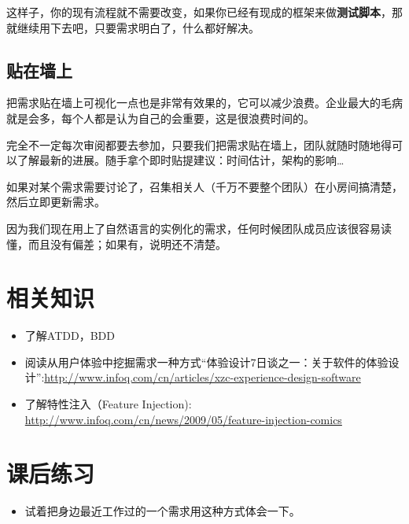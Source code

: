 这样子，你的现有流程就不需要改变，如果你已经有现成的框架来做\textbf{测试脚本}，那就继续用下去吧，只要需求明白了，什么都好解决。

\subsection{贴在墙上}
\label{贴在墙上}

把需求贴在墙上可视化一点也是非常有效果的，它可以减少浪费。企业最大的毛病就是会多，每个人都是认为自己的会重要，这是很浪费时间的。

完全不一定每次审阅都要去参加，只要我们把需求贴在墙上，团队就随时随地得可以了解最新的进展。随手拿个即时贴提建议：时间估计，架构的影响{\ldots}

如果对某个需求需要讨论了，召集相关人（千万不要整个团队）在小房间搞清楚，然后立即更新需求。

因为我们现在用上了自然语言的实例化的需求，任何时候团队成员应该很容易读懂，而且没有偏差；如果有，说明还不清楚。

\section{相关知识}
\label{相关知识}

\begin{itemize}
\item 了解ATDD，BDD

\item 阅读从用户体验中挖掘需求一种方式``体验设计7日谈之一：关于软件的体验设计'':\href{http://www.infoq.com/cn/articles/xzc-experience-design-software}{http:/\slash www.infoq.com\slash cn\slash articles\slash xzc-experience-design-software}

\item 了解特性注入（Feature Injection): \href{http://www.infoq.com/cn/news/2009/05/feature-injection-comics}{http:/\slash www.infoq.com\slash cn\slash news\slash 2009\slash 05\slash feature-injection-comics}

\end{itemize}

\section{课后练习}
\label{课后练习}

\begin{itemize}
\item 试着把身边最近工作过的一个需求用这种方式体会一下。

\end{itemize}

